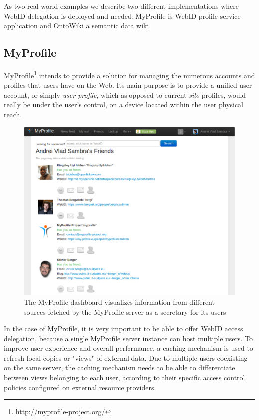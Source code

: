 \documentclass[a4paper]{llncs}
\begin{document}
As two real-world examples we describe two different implementations where WebID delegation is deployed and needed.
MyProfile is WebID profile service application and OntoWiki a semantic data wiki.

\subsection{MyProfile}

MyProfile\footnote{\url{http://myprofile-project.org/}} intends to provide a solution for managing the numerous accounts and profiles that users have on the Web.
Its main purpose is to provide a unified user account, or simply \textit{user profile}, which as opposed to current \textit{silo} profiles, would really be under the user's control, on a device located within the user physical reach.

\begin{figure}[htb]
  \centering
  \includegraphics[width=\textwidth]{myprofile}
  \caption{The MyProfile dashboard visualizes information from different sources fetched by the MyProfile server as a secretary for its users}
  \label{fig:myprofile}
\end{figure}

In the case of MyProfile, it is very important to be able to offer WebID access delegation, because a single MyProfile server instance can host multiple users.
To improve user experience and overall performance, a caching mechanism is used to refresh local copies or "views" of external data.
Due to multiple users coexisting on the same server, the caching mechanism needs to be able to differentiate between views belonging to each user, according to their specific access control policies configured on external resource providers.
\end{document}
